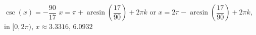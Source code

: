  {$\csc(x) = -\dfrac{90}{17}$}
{ $x = \pi + \arcsin\left(\dfrac{17}{90}\right) + 2\pi k$ or $x = 2\pi - \arcsin\left(\dfrac{17}{90}\right) + 2\pi k$, in  $[0, 2\pi)$, $x \approx 3.3316, \, 6.0932$}
